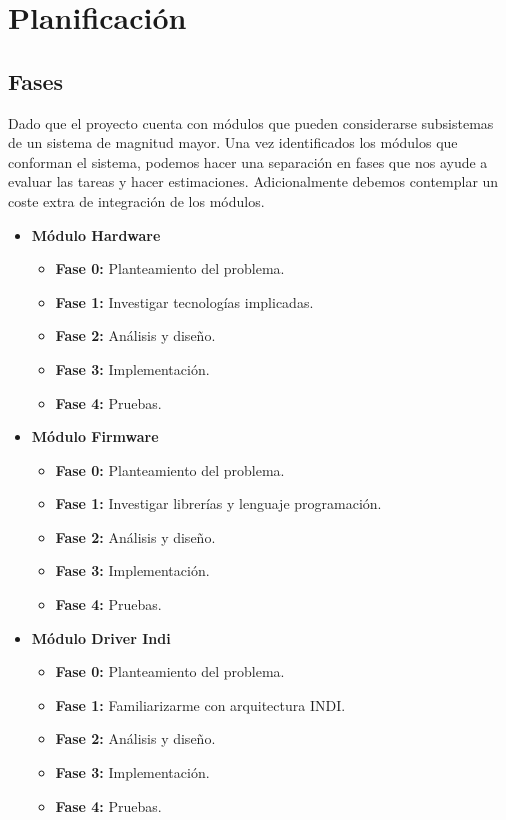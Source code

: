 \chapter{Planificación}

\section{Fases}

Dado que el proyecto cuenta con módulos que pueden considerarse subsistemas de un sistema de magnitud mayor. 
Una vez identificados los módulos que conforman el sistema, podemos hacer una separación en fases que nos ayude a evaluar las tareas y
hacer estimaciones. Adicionalmente debemos contemplar un coste extra de integración de los módulos.

\begin{itemize}
	
	\item \textbf{ Módulo Hardware}
	\begin{itemize}
		\item \textbf{Fase 0:} Planteamiento del problema.
		\item \textbf{Fase 1:} Investigar tecnologías implicadas.
		\item \textbf{Fase 2:} Análisis y diseño.
		\item \textbf{Fase 3:} Implementación.
		\item \textbf{Fase 4:} Pruebas.
	\end{itemize}
	
	\item \textbf{Módulo Firmware}
	\begin{itemize}
		\item \textbf{Fase 0:} Planteamiento del problema.
		\item \textbf{Fase 1:} Investigar librerías y lenguaje programación.
		\item \textbf{Fase 2:} Análisis y diseño.
		\item \textbf{Fase 3:} Implementación.
		\item \textbf{Fase 4:} Pruebas.
	\end{itemize}
	
	\item \textbf{Módulo Driver Indi}
	\begin{itemize}
		\item \textbf{Fase 0:} Planteamiento del problema.
		\item \textbf{Fase 1:} Familiarizarme con arquitectura INDI.
		\item \textbf{Fase 2:} Análisis y diseño.
		\item \textbf{Fase 3:} Implementación.
		\item \textbf{Fase 4:} Pruebas.
	\end{itemize}
	

\end{itemize}

